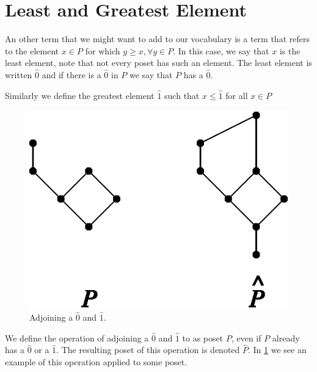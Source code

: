 \section{Least and Greatest Element}
\label{tree:poset:leastandgreatest}

An other term that we might want to add to our vocabulary is a term that refers to the element $x \in P$ for which $y \geq x, \forall y \in P$. In this case, we say that $x$ is the least element, note that not every poset has such an element. The least element is written $\hat{0}$ and if there is a $\hat{0}$ in $P$ we say that $P$ has a $\hat{0}$.

Similarly we define the greatest element $\hat{1}$ such that $x \leq \hat{1}$ for all $x \in P$

\begin{figure}
	\centering
	\includegraphics[height=0.2\textheight]{fig/stanley/3-3}
	\caption{\label{fig:stanley:3-3} Adjoining a $\hat{0}$ and $\hat{1}$. \cite{Stanley:2011:ECV:2124415}}
\end{figure}

We define the operation of adjoining a $\hat{0}$ and $\hat{1}$ to as poset $P$, even if $P$ already has a $\hat{0}$ or a $\hat{1}$. The resulting poset of this operation is denoted $\hat{P}$. In \ref{fig:stanley:3-3} we see an example of this operation applied to some poset.




